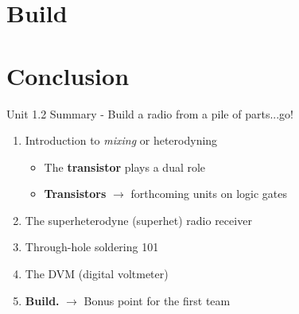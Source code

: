 \documentclass{beamer}
\begin{document}
\section{Build}

\section{Conclusion}

\begin{frame}{Unit 1.2 Summary - Build a radio from a pile of parts...go!}
\begin{enumerate}
\item Introduction to \textit{mixing} or \alert{heterodyning}
\begin{itemize}
\item The \textbf{transistor} plays a dual role
\item \textbf{Transistors} $\rightarrow$ forthcoming units on logic gates
\end{itemize}
\item The superheterodyne (superhet) radio receiver
\item Through-hole soldering 101
\item The DVM (digital voltmeter)
\item \textbf{Build.} $\rightarrow$ Bonus point for the first team
\end{enumerate}
\end{frame}
\end{document}
